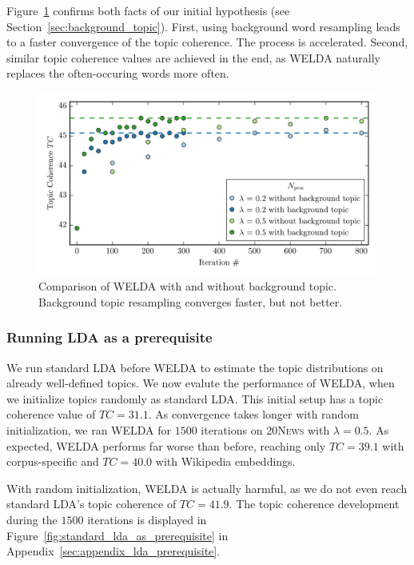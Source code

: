 \documentclass[
        a4paper,
        titlepage,
        twoside,
        parskip
        ]{scrbook}
\theoremstyle{break}
\begin{document}
Figure~\ref{fig:welda_gaussian_background_topic} confirms both facts of our initial hypothesis (see Section~\ref{sec:background_topic}).
First, using background word resampling leads to a faster convergence of the topic coherence.
The process is accelerated.
Second, similar topic coherence values are achieved in the end, as WELDA naturally replaces the often-occuring words more often.

\begin{figure}
       \centering
       \includegraphics[width=\textwidth]{figures/welda_gaussian_background_topic.png}
       \caption{Comparison of WELDA with and without background topic. Background topic resampling converges faster, but not better.}
       \label{fig:welda_gaussian_background_topic}
\end{figure}

\subsubsection{Running LDA as a prerequisite}

We run standard LDA before WELDA to estimate the topic distributions on already well-defined topics.
We now evalute the performance of WELDA, when we initialize topics randomly as standard LDA.
This initial setup has a topic coherence value of $TC = 31.1$.
As convergence takes longer with random initialization, we ran WELDA for $1500$ iterations on \textsc{20News} with $\lambda = 0.5$.
As expected, WELDA performs far worse than before, reaching only $TC = 39.1$ with corpus-specific and $TC = 40.0$ with Wikipedia embeddings.



With random initialization, WELDA is actually harmful, as we do not even reach standard LDA's topic coherence of $TC = 41.9$.
The topic coherence development during the $1500$ iterations is displayed in Figure~\ref{fig:standard_lda_as_prerequisite} in Appendix~\ref{sec:appendix_lda_prerequisite}.
\end{document}
